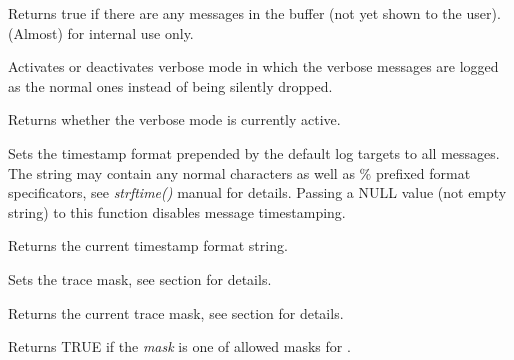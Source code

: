 
Returns true if there are any messages in the buffer (not yet shown to the
user). (Almost) for internal use only.

\label{wxlogsetverbose}


Activates or deactivates verbose mode in which the verbose messages are
logged as the normal ones instead of being silently dropped.

\label{wxloggetverbose}


Returns whether the verbose mode is currently active.

\label{wxlogsettimestamp}


Sets the timestamp format prepended by the default log targets to all
messages. The string may contain any normal characters as well as \%
prefixed format specificators, see {\it strftime()} manual for details.
Passing a NULL value (not empty string) to this function disables message timestamping.

\label{wxloggettimestamp}


Returns the current timestamp format string.

\label{wxlogsettracemask}


Sets the trace mask, see 
section for details.

\label{wxloggettracemask}

Returns the current trace mask, see  section
for details.

\label{wxlogisallowedtracemask}


Returns TRUE if the {\it mask} is one of allowed masks for 
.

